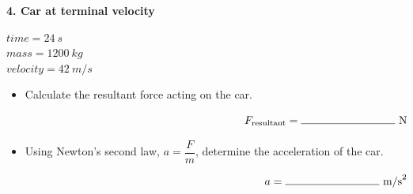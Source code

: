 \documentclass[12pt]{article}
\begin{document}
\noindent
\begin{minipage}[t]{0.48\textwidth}

\textbf{4. Car at terminal velocity}

\vspace{0.5cm}
$time = \SI{24}{s}$ \\
$mass = \SI{1200}{kg}$ \\
$velocity = \SI{42}{m/s}$ \\

\vspace{0.5cm}

\begin{center}
\end{center}

\end{minipage}
\hfill
\begin{minipage}[t]{0.48\textwidth}

\begin{itemize}[label={}, leftmargin=*]
    \item Calculate the resultant force acting on the car.

    \vspace{2.0cm}
    \[
    \makebox[\linewidth][r]{$F_{\text{resultant}} = \rule{3cm}{0.4pt}\ \text{N}$}
    \]

    \item Using Newton’s second law, $a = \dfrac{F}{m}$, determine the acceleration of the car.

    \vspace{2.0cm}
    \[
    \makebox[\linewidth][r]{$a = \rule{3cm}{0.4pt}\ \text{m/s}^{2}$}
    \]
\end{itemize}

\end{minipage}
\end{document}

